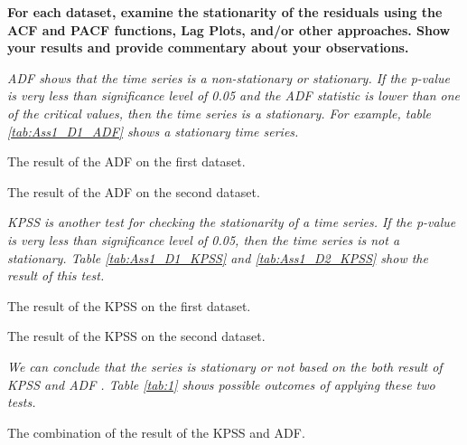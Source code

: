 \item \textbf{For each dataset, examine the stationarity of the residuals using the ACF and PACF functions, Lag Plots, and/or other approaches. Show your results and provide commentary about your observations.}

\textit{\gls{ADF} shows that the time series is a non-stationary or stationary. If the p-value is very less than significance level of 0.05 and the \gls{ADF} statistic is lower than one of the critical values, then the time series is a stationary. For example, table \ref{tab:Ass1_D1_ADF} shows a stationary time series.}

\begin{table}[H]
\centering
\caption{The result of the \gls{ADF} on the first dataset.}
\label{tab:Ass1_D1_ADF}

\end{table}

\begin{table}[H]
\centering
\caption{The result of the \gls{ADF} on the second dataset.}
\label{tab:Ass1_D2_ADF}

\end{table}


\textit{ \gls{KPSS} is another test for checking the stationarity of a time series. If the p-value is very less than significance level of 0.05, then the time series is not a stationary. Table \ref{tab:Ass1_D1_KPSS} and \ref{tab:Ass1_D2_KPSS} show the result of  this test.}

\begin{table}[H]
\centering
\caption{The result of the \gls{KPSS} on the first dataset.}
\label{tab:Ass1_D1_KPSS}

\end{table}

\begin{table}[H]
\centering
\caption{The result of the \gls{KPSS} on the second dataset.}
\label{tab:Ass1_D2_KPSS}

\end{table}

\textit{We can conclude that the series is stationary or not based on the both result of \gls{KPSS} and \gls{ADF} \cite{StationarityStatsmodels}. Table \ref{tab:1} shows possible outcomes of applying these two tests.}

\begin{table}[H]
\centering
\caption{The combination of the result of the \gls{KPSS} and \gls{ADF}.}
\label{tab:1}

\end{table}



